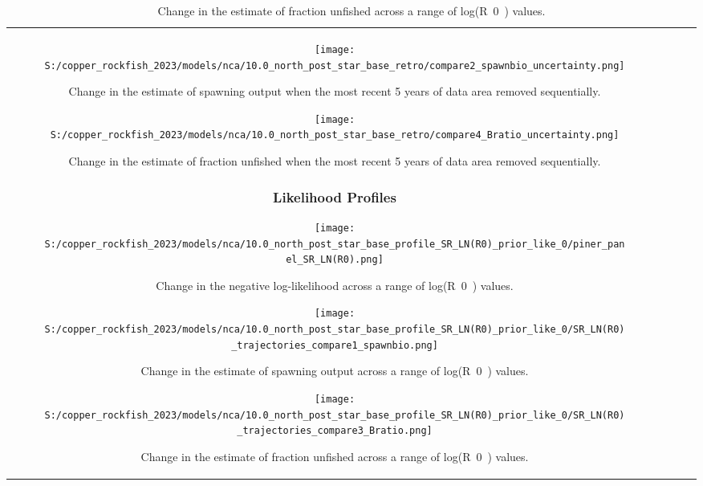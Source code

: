 \documentclass[11pt,
  letterpaper,
]{article}
\begin{document}
\begin{longtable}[t]{c>{\centering\arraybackslash}p{2cm}>{\centering\arraybackslash}p{2cm}>{\centering\arraybackslash}p{2cm}}
\newpage

\begin{figure}
{\centering
\texttt{[image: S:/copper\_rockfish\_2023/models/nca/10.0\_north\_post\_star\_base\_retro/compare2\_spawnbio\_uncertainty.png]}
}
\caption{Change in the estimate of spawning output when the most recent 5 years of data area removed sequentially.\label{fig:retro-ssb}}
\end{figure}

\pagebreak

\begin{figure}
{\centering
\texttt{[image: S:/copper\_rockfish\_2023/models/nca/10.0\_north\_post\_star\_base\_retro/compare4\_Bratio\_uncertainty.png]}
}
\caption{Change in the estimate of fraction unfished when the most recent 5 years of data area removed sequentially.\label{fig:retro-depl}}
\end{figure}

\pagebreak

\subsubsection{Likelihood Profiles}\label{likelihood-profiles-1}

\begin{figure}
{\centering
\texttt{[image: S:/copper\_rockfish\_2023/models/nca/10.0\_north\_post\_star\_base\_profile\_SR\_LN(R0)\_prior\_like\_0/piner\_panel\_SR\_LN(R0).png]}
}
\caption{Change in the negative log-likelihood across a range of log(R~0~) values.\label{fig:r0-profile}}
\end{figure}

\pagebreak

\begin{figure}
{\centering
\texttt{[image: S:/copper\_rockfish\_2023/models/nca/10.0\_north\_post\_star\_base\_profile\_SR\_LN(R0)\_prior\_like\_0/SR\_LN(R0)\_trajectories\_compare1\_spawnbio.png]}
}
\caption{Change in the estimate of spawning output across a range of log(R~0~) values.\label{fig:r0-ssb}}
\end{figure}

\pagebreak

\begin{figure}
{\centering
\texttt{[image: S:/copper\_rockfish\_2023/models/nca/10.0\_north\_post\_star\_base\_profile\_SR\_LN(R0)\_prior\_like\_0/SR\_LN(R0)\_trajectories\_compare3\_Bratio.png]}
}
\caption{Change in the estimate of fraction unfished across a range of log(R~0~) values.\label{fig:r0-depl}}
\end{figure}


\end{longtable}
\end{document}
